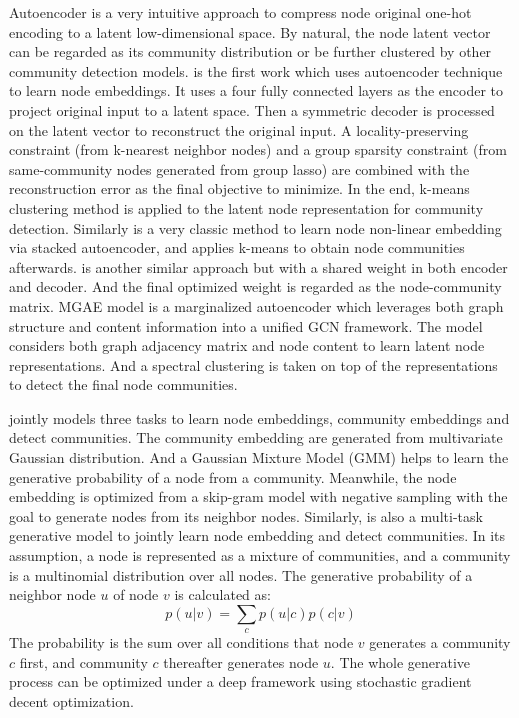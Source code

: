 Autoencoder is a very intuitive approach to compress node original one-hot encoding to a latent low-dimensional space. By natural, the node latent vector can be regarded as its community distribution or be further clustered by other community detection models. \cite{huang2014deep} is the first work which uses autoencoder technique to learn node embeddings. It uses a four fully connected layers as the encoder to project original input to a latent space. Then a symmetric decoder is processed on the latent vector to reconstruct the original input. A locality-preserving constraint (from k-nearest neighbor nodes) and a group sparsity constraint (from same-community nodes generated from group lasso) are combined with the reconstruction error as the final objective to minimize. In the end, k-means clustering method is applied to the latent node representation for community detection. Similarly \cite{tian2014learning} is a very classic method to learn node non-linear embedding via stacked autoencoder, and applies k-means to obtain node communities afterwards. \cite{sun2017non} is another similar approach but with a shared weight in both encoder and decoder. And the final optimized weight is regarded as the node-community matrix. MGAE model \cite{wang2017mgae} is a marginalized autoencoder which leverages both graph structure and content information into a unified GCN framework. The model considers both graph adjacency matrix and node content to learn latent node representations. And a spectral clustering is taken on top of the representations to detect the final node communities.

\cite{cavallari2017learning} jointly models three tasks to learn node embeddings, community embeddings and detect communities. The community embedding are generated from multivariate Gaussian distribution. And a Gaussian Mixture Model (GMM) helps to learn the generative probability of a node from a community. Meanwhile, the node embedding is optimized from a skip-gram model with negative sampling with the goal to generate nodes from its neighbor nodes.  Similarly, \cite{sun2019vgraph} is also a multi-task generative model to jointly learn node embedding and detect communities. In its assumption, a node is represented as a mixture of communities, and a community is a multinomial distribution over all nodes.  The generative probability of a neighbor node $u$ of node $v$ is calculated as:
\begin{equation}
p(u|v) = \sum_{c}p(u|c)p(c|v)
\end{equation}
The probability is the sum over all conditions that node $v$ generates a community $c$ first, and community $c$ thereafter generates node $u$. The whole generative process can be optimized under a deep framework using stochastic gradient decent optimization.

